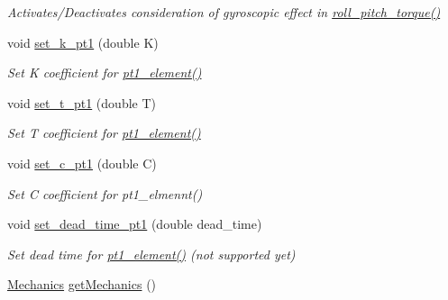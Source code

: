 \begin{DoxyCompactItemize}
\begin{DoxyCompactList}\small\item\em \-Activates/\-Deactivates consideration of gyroscopic effect in \hyperlink{classQuadRotorDynamics_af7e8d034a94d648d9d6136e0540db630}{roll\-\_\-pitch\-\_\-torque()} \end{DoxyCompactList}\item 
\hypertarget{classQuadRotorDynamics_aba615011e777f74007ad85f081a4461d}{void \hyperlink{classQuadRotorDynamics_aba615011e777f74007ad85f081a4461d}{set\-\_\-k\-\_\-pt1} (double \-K)}\label{classQuadRotorDynamics_aba615011e777f74007ad85f081a4461d}

\begin{DoxyCompactList}\small\item\em \-Set \-K coefficient for \hyperlink{classQuadRotorDynamics_a9755a314e2c4d7abc54135bb127b8d75}{pt1\-\_\-element()} \end{DoxyCompactList}\item 
\hypertarget{classQuadRotorDynamics_a143f29c5e77618243f63ebcca816616e}{void \hyperlink{classQuadRotorDynamics_a143f29c5e77618243f63ebcca816616e}{set\-\_\-t\-\_\-pt1} (double \-T)}\label{classQuadRotorDynamics_a143f29c5e77618243f63ebcca816616e}

\begin{DoxyCompactList}\small\item\em \-Set \-T coefficient for \hyperlink{classQuadRotorDynamics_a9755a314e2c4d7abc54135bb127b8d75}{pt1\-\_\-element()} \end{DoxyCompactList}\item 
\hypertarget{classQuadRotorDynamics_a65438d151cc47e28e071c6871e4723cd}{void \hyperlink{classQuadRotorDynamics_a65438d151cc47e28e071c6871e4723cd}{set\-\_\-c\-\_\-pt1} (double \-C)}\label{classQuadRotorDynamics_a65438d151cc47e28e071c6871e4723cd}

\begin{DoxyCompactList}\small\item\em \-Set \-C coefficient for pt1\-\_\-elmennt() \end{DoxyCompactList}\item 
\hypertarget{classQuadRotorDynamics_ad743aee3d06c6987d0a70e4503f9c7c6}{void \hyperlink{classQuadRotorDynamics_ad743aee3d06c6987d0a70e4503f9c7c6}{set\-\_\-dead\-\_\-time\-\_\-pt1} (double dead\-\_\-time)}\label{classQuadRotorDynamics_ad743aee3d06c6987d0a70e4503f9c7c6}

\begin{DoxyCompactList}\small\item\em \-Set dead time for \hyperlink{classQuadRotorDynamics_a9755a314e2c4d7abc54135bb127b8d75}{pt1\-\_\-element()} (not supported yet) \end{DoxyCompactList}\item 
\hypertarget{classQuadRotorDynamics_a57f4210aee5f8ddde170d4b9f62fde2b}{\hyperlink{classMechanics}{\-Mechanics} \hyperlink{classQuadRotorDynamics_a57f4210aee5f8ddde170d4b9f62fde2b}{get\-Mechanics} ()}\label{classQuadRotorDynamics_a57f4210aee5f8ddde170d4b9f62fde2b}


\end{DoxyCompactItemize}
